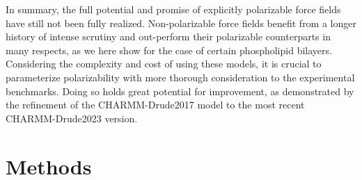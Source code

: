 \documentclass[journal=jacsat,manuscript=article,layout=singlecolumn]{achemso}
\begin{document}
 In summary, the full potential and promise of explicitly polarizable force fields have still not been fully realized. Non-polarizable force fields benefit from a longer history of intense scrutiny and out-perform their polarizable counterparts in many respects, as we here show for the case of certain phospholipid bilayers. Considering the complexity and cost of using these models, it is crucial to parameterize polarizability with more thorough consideration to the experimental benchmarks. Doing so holds great potential for improvement, as demonstrated by the refinement of the CHARMM-Drude2017 model to the most recent CHARMM-Drude2023 version.

\section{Methods}
\end{document}
